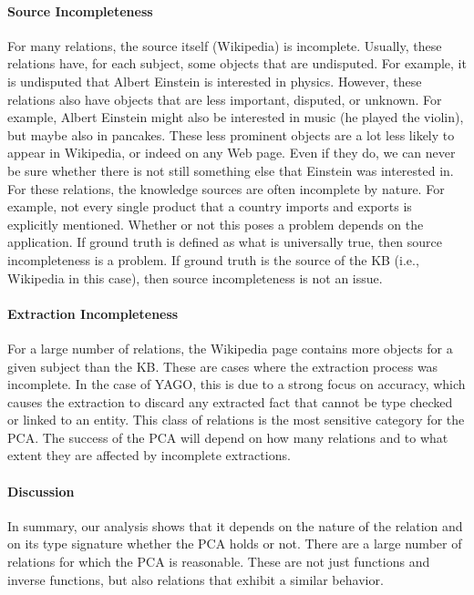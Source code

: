 \paragraph{Source Incompleteness} For many relations, the source itself (Wikipedia) is incomplete.
Usually, these relations have, for each subject, some objects that are undisputed.
For example, it is undisputed that Albert Einstein is interested in physics. However, these relations also have objects that are less important, disputed, or unknown.
For example, Albert Einstein might also be interested in music (he played the violin), but maybe also in pancakes.
These less prominent objects are a lot less likely to appear in Wikipedia, or indeed on any Web page.
Even if they do, we can never be sure whether there is not still something else that Einstein was interested in.
For these relations, the knowledge sources are often incomplete by nature.
For example, not every single product that a country imports and exports is explicitly mentioned.
Whether or not this poses a problem depends on the application.
If ground truth is defined as what is universally true, then source incompleteness is a problem.
If ground truth is the source of the KB (i.e., Wikipedia in this case), then source incompleteness is not an issue.


\paragraph{Extraction Incompleteness} For a large number of relations, the Wikipedia page contains more objects for a given subject than the KB.
These are cases where the extraction process was incomplete.
In the case of YAGO, this is due to a strong focus on accuracy,
which causes the extraction to discard any extracted fact that cannot be type checked or linked to an entity.
This class of relations is the most sensitive category for the PCA.
The success of the PCA will depend on how many relations and to what extent they are affected by incomplete extractions.

\paragraph{Discussion} In summary, our analysis shows that it depends on the nature of the relation and on its type signature whether the PCA holds or not.
 There are a large number of relations for which the PCA is reasonable.
These are not just functions and inverse functions, but also relations that exhibit a similar behavior.

